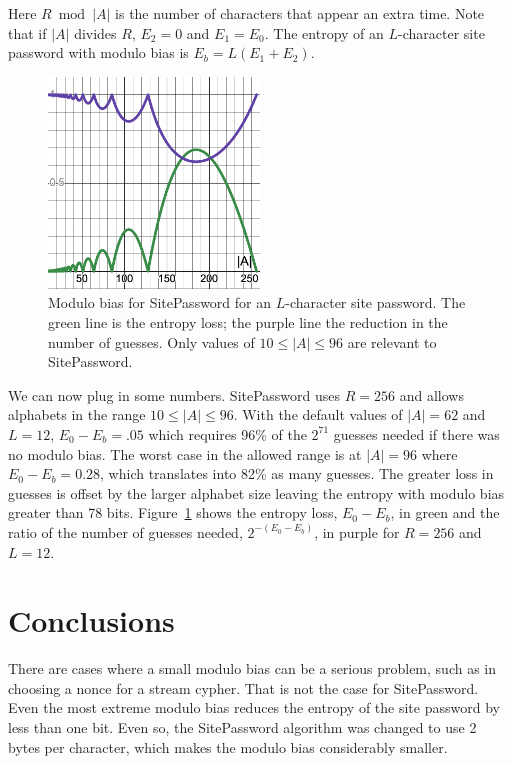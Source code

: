 \documentclass[11pt, oneside]{article}   	%
\begin{document}
Here $R \bmod|A|$ is the number of characters that appear an extra time.  Note that if $|A|$ divides $R$, $E_2 = 0$ and $E_1 = E_0$.  The entropy of an $L$-character site password with modulo bias is $E_b = L(E_1 + E_2)$.  

\begin{figure}
    \centering
    \includegraphics[width=0.5\textwidth]{moduloBias.png} 
    \caption{Modulo bias for SitePassword for an $L$-character site password.  The green line is the entropy loss; the purple line the reduction in the number of guesses.  Only values of $10 \leq |A| \leq 96$ are relevant to SitePassword.}
    \label{fig}
\end{figure}

We can now plug in some numbers.  SitePassword uses $R = 256$ and allows alphabets in the range $10 \leq |A| \leq 96$.  With the default values of $|A| = 62$ and $L = 12$, $E_0 - E_b = .05$ which requires 96\% of the $2^{71}$ guesses needed if there was no modulo bias.  The worst case in the allowed range is at $|A| = 96$ where $E_0 - E_b = 0.28$, which translates into 82\% as many guesses.  The greater loss in guesses is offset by the larger alphabet size leaving the entropy with modulo bias greater than 78 bits.  Figure~\ref{fig} shows the entropy loss, $E_0 - E_b$, in green and the ratio of the number of guesses needed, $2^{-(E_0-E_b)}$, in purple for $R = 256$ and $L = 12$.

\section{Conclusions}

There are cases where a small modulo bias can be a serious problem, such as in choosing a nonce for a stream cypher.  That is not the case for SitePassword.  Even the most extreme modulo bias reduces the entropy of the site password by less than one bit.  Even so, the SitePassword algorithm was changed to use 2 bytes per character, which makes the modulo bias considerably smaller.
\end{document}
